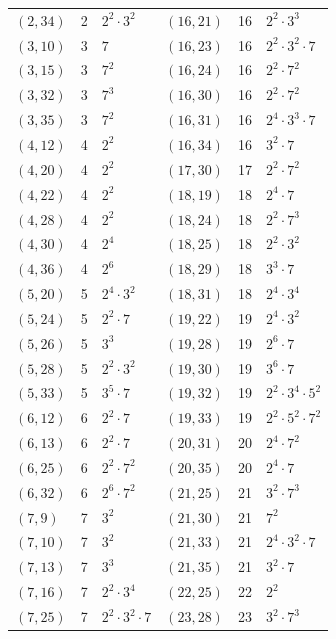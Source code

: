 \documentclass[11pt]{article}
\begin{document}
\begin{longtable}{@{}lrl@{\qquad}lrl@{}}
$(2,34)$ & 2 & $2^{2}\cdot 3^{2}$ & $(16,21)$ & 16 & $2^{2}\cdot 3^{3}$\\
$(3,10)$ & 3 & $7$ & $(16,23)$ & 16 & $2^{2}\cdot 3^{2}\cdot 7$\\
$(3,15)$ & 3 & $7^{2}$ & $(16,24)$ & 16 & $2^{2}\cdot 7^{2}$\\
$(3,32)$ & 3 & $7^{3}$ & $(16,30)$ & 16 & $2^{2}\cdot 7^{2}$\\
$(3,35)$ & 3 & $7^{2}$ & $(16,31)$ & 16 & $2^{4}\cdot 3^{3}\cdot 7$\\
$(4,12)$ & 4 & $2^{2}$ & $(16,34)$ & 16 & $3^{2}\cdot 7$\\
$(4,20)$ & 4 & $2^{2}$ & $(17,30)$ & 17 & $2^{2}\cdot 7^{2}$\\
$(4,22)$ & 4 & $2^{2}$ & $(18,19)$ & 18 & $2^{4}\cdot 7$\\
$(4,28)$ & 4 & $2^{2}$ & $(18,24)$ & 18 & $2^{2}\cdot 7^{3}$\\
$(4,30)$ & 4 & $2^{4}$ & $(18,25)$ & 18 & $2^{2}\cdot 3^{2}$\\
$(4,36)$ & 4 & $2^{6}$ & $(18,29)$ & 18 & $3^{3}\cdot 7$\\
$(5,20)$ & 5 & $2^{4}\cdot 3^{2}$ & $(18,31)$ & 18 & $2^{4}\cdot 3^{4}$\\
$(5,24)$ & 5 & $2^{2}\cdot 7$ & $(19,22)$ & 19 & $2^{4}\cdot 3^{2}$\\
$(5,26)$ & 5 & $3^{3}$ & $(19,28)$ & 19 & $2^{6}\cdot 7$\\
$(5,28)$ & 5 & $2^{2}\cdot 3^{2}$ & $(19,30)$ & 19 & $3^{6}\cdot 7$\\
$(5,33)$ & 5 & $3^{5}\cdot 7$ & $(19,32)$ & 19 & $2^{2}\cdot 3^{4}\cdot 5^{2}$\\
$(6,12)$ & 6 & $2^{2}\cdot 7$ & $(19,33)$ & 19 & $2^{2}\cdot 5^{2}\cdot 7^{2}$\\
$(6,13)$ & 6 & $2^{2}\cdot 7$ & $(20,31)$ & 20 & $2^{4}\cdot 7^{2}$\\
$(6,25)$ & 6 & $2^{2}\cdot 7^{2}$ & $(20,35)$ & 20 & $2^{4}\cdot 7$\\
$(6,32)$ & 6 & $2^{6}\cdot 7^{2}$ & $(21,25)$ & 21 & $3^{2}\cdot 7^{3}$\\
$(7,9)$ & 7 & $3^{2}$ & $(21,30)$ & 21 & $7^{2}$\\
$(7,10)$ & 7 & $3^{2}$ & $(21,33)$ & 21 & $2^{4}\cdot 3^{2}\cdot 7$\\
$(7,13)$ & 7 & $3^{3}$ & $(21,35)$ & 21 & $3^{2}\cdot 7$\\
$(7,16)$ & 7 & $2^{2}\cdot 3^{4}$ & $(22,25)$ & 22 & $2^{2}$\\
$(7,25)$ & 7 & $2^{2}\cdot 3^{2}\cdot 7$ & $(23,28)$ & 23 & $3^{2}\cdot 7^{3}$\\

\end{longtable}
\end{document}

